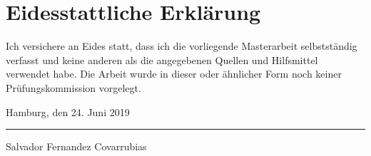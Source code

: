 
\section*{Eidesstattliche Erklärung}
\vspace{18pt}
Ich versichere an Eides statt, dass ich die vorliegende Masterarbeit selbstständig
verfasst und keine anderen als die angegebenen Quellen und Hilfsmittel verwendet
habe. Die Arbeit wurde in dieser oder ähnlicher Form noch keiner Prüfungskommission
vorgelegt.
\vspace{60pt}

\noindent Hamburg, den 24. Juni 2019 \hfill \rule{0.55\textwidth}{0.5pt} \par
\hfill\noindent Salvador Fernandez Covarrubias \hspace{1.0cm}


